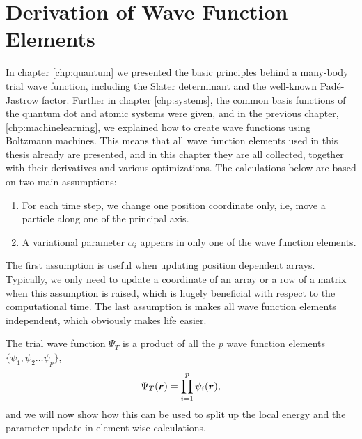 \chapter{Derivation of Wave Function Elements} \label{chp:WFE}
In chapter \eqref{chp:quantum} we presented the basic principles behind a many-body trial wave function, including the Slater determinant and the well-known Padé-Jastrow factor. Further in chapter \eqref{chp:systems}, the common basis functions of the quantum dot and atomic systems were given, and in the previous chapter, \eqref{chp:machinelearning}, we explained how to create wave functions using Boltzmann machines. This means that all wave function elements used in this thesis already are presented, and in this chapter they are all collected, together with their derivatives and various optimizations. The calculations below are based on two main assumptions:
\begin{enumerate}
	\item For each time step, we change one position coordinate only, i.e, move a particle along one of the principal axis.
	\item A variational parameter $\alpha_i$ appears in only one of the wave function elements.
\end{enumerate}
The first assumption is useful when updating position dependent arrays. Typically, we only need to update a coordinate of an array or a row of a matrix when this assumption is raised, which is hugely beneficial with respect to the computational time. The last assumption is makes all wave function elements independent, which obviously makes life easier. 

The trial wave function $\Psi_T$ is a product of all the $p$ wave function elements $\{\psi_1, \psi_2\hdots\psi_p\}$,
\begin{equation}
\Psi_T(\boldsymbol{{r}}) = \prod_{i=1}^p\psi_i(\boldsymbol{{r}}),
\label{eq:elementproduct}
\end{equation}
and we will now show how this can be used to split up the local energy and the parameter update in element-wise calculations.

